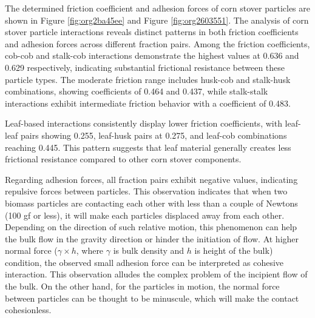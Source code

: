 \documentclass[xcolor=dvipsnames,10pt,hidelinks]{article}
\begin{document}
The determined friction coefficient and adhesion forces of corn stover particles are shown in Figure \ref{fig:org2ba45ee} and Figure \ref{fig:org2603551}.
The analysis of corn stover particle interactions reveals distinct patterns in both friction coefficients and adhesion forces across different fraction pairs. Among the friction coefficients, cob-cob and stalk-cob interactions demonstrate the highest values at 0.636 and 0.629 respectively, indicating substantial frictional resistance between these particle types. The moderate friction range includes husk-cob and stalk-husk combinations, showing coefficients of 0.464 and 0.437, while stalk-stalk interactions exhibit intermediate friction behavior with a coefficient of 0.483.

Leaf-based interactions consistently display lower friction coefficients, with leaf-leaf pairs showing 0.255, leaf-husk pairs at 0.275, and leaf-cob combinations reaching 0.445. This pattern suggests that leaf material generally creates less frictional resistance compared to other corn stover components.

Regarding adhesion forces, all fraction pairs exhibit negative values, indicating repulsive forces between particles.
This observation indicates that when two biomass particles are contacting each other with less than a couple of Newtons (100 gf or less),
it will make each particles displaced away from each other.
Depending on the direction of such relative motion, this phenomenon can help the bulk flow in the gravity direction or hinder the initiation of flow.
At higher normal force (\(\gamma\times h\), where \(\gamma\) is bulk density and \(h\) is height of the bulk) condition,
the observed small adhesion force can be interpreted as cohesive interaction.
This observation alludes the complex problem of the incipient flow of the bulk.
On the other hand, for the particles in motion, the normal force between particles can be thought to be minuscule, which will make the contact cohesionless.
\end{document}
